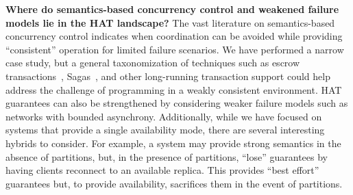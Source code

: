 \textbf{Where do semantics-based concurrency control and weakened
  failure models lie in the HAT landscape?} The vast literature on
semantics-based concurrency control indicates when coordination can be
avoided while providing ``consistent'' operation for limited failure
scenarios. We have performed a narrow case study, but a general
taxonomization of techniques such as escrow
transactions~\cite{escrow}, Sagas~\cite{sagas}, and other long-running
transaction support could help address the challenge of programming in
a weakly consistent environment. HAT guarantees can also be
strengthened by considering weaker failure models such as networks
with bounded asynchrony. Additionally, while we have focused on
systems that provide a single availability mode, there are several
interesting hybrids to consider. For example, a system may provide
strong semantics in the absence of partitions, but, in the presence of
partitions, ``lose'' guarantees by having clients reconnect to an
available replica. This provides ``best effort'' guarantees but, to
provide availability, sacrifices them in the event of partitions.

